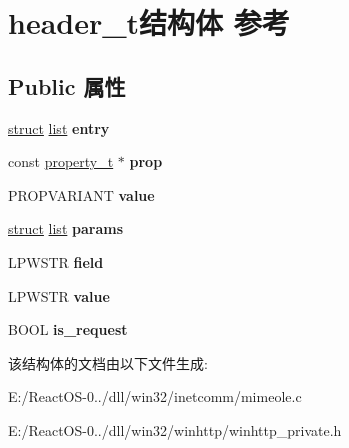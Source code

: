 \hypertarget{structheader__t}{}\section{header\+\_\+t结构体 参考}
\label{structheader__t}
\subsection*{Public 属性}
\begin{DoxyCompactItemize}
\item 
\mbox{\label{structheader__t_a7245eedc1578140ea3abe82940ff3c78}} 
\hyperlink{interfacestruct}{struct} \hyperlink{classlist}{list} {\bfseries entry}
\item 
\mbox{\label{structheader__t_a29433fd8e418214957870ee576c045d6}} 
const \hyperlink{structproperty__t}{property\+\_\+t} $\ast$ {\bfseries prop}
\item 
\mbox{\label{structheader__t_a746723477da9ab80d0de42fcf3c0d8f5}} 
P\+R\+O\+P\+V\+A\+R\+I\+A\+NT {\bfseries value}
\item 
\mbox{\label{structheader__t_acfd57ffa043202fc45abb506c3fe644a}} 
\hyperlink{interfacestruct}{struct} \hyperlink{classlist}{list} {\bfseries params}
\item 
\mbox{\label{structheader__t_ab91be225c9b39fa8fb50f6cab68f9204}} 
L\+P\+W\+S\+TR {\bfseries field}
\item 
\mbox{\label{structheader__t_a5019566369680cf6e240ec25897643c9}} 
L\+P\+W\+S\+TR {\bfseries value}
\item 
\mbox{\label{structheader__t_a555508fafc32b3bb7209e7d89b832ab1}} 
B\+O\+OL {\bfseries is\+\_\+request}
\end{DoxyCompactItemize}


该结构体的文档由以下文件生成\+:\begin{DoxyCompactItemize}
\item 
E\+:/\+React\+O\+S-\/0../dll/win32/inetcomm/mimeole.\+c\item 
E\+:/\+React\+O\+S-\/0../dll/win32/winhttp/winhttp\+\_\+private.\+h\end{DoxyCompactItemize}

